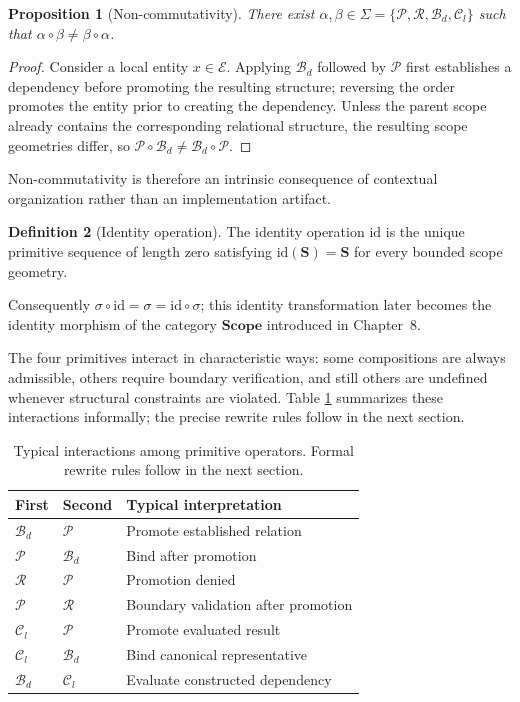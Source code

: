 \documentclass[11pt,twoside,openright]{book}
\numberwithin{equation}{chapter}
\theoremstyle{definition}
\newtheorem{definition}{Definition}[chapter]
\theoremstyle{plain}
\newtheorem{proposition}[definition]{Proposition}
\theoremstyle{remark}
\theoremstyle{definition}
\newcommand{\CatScope}{\mathbf{Scope}}
\newcommand{\Scope}{\mathbf{S}}
\newcommand{\ScopeMorph}{\sigma}
\newcommand{\Alphabet}{\Sigma}
\newcommand{\Pop}{\mathcal{P}}
\newcommand{\Refuse}{\mathcal{R}}
\newcommand{\Bind}{\mathcal{B}_d}
\newcommand{\Collapse}{\mathcal{C}_l}
\newcommand{\ScopeAlphabet}{\Alphabet=\{\Pop,\Refuse,\Bind,\Collapse\}}
\newcommand{\Interior}{\mathcal{E}}
\begin{document}
\begin{proposition}[Non-commutativity]
There exist $\alpha,\beta\in\ScopeAlphabet$ such that
$\alpha\circ\beta\neq\beta\circ\alpha$.
\end{proposition}

\begin{proof}
Consider a local entity $x\in\Interior$. Applying $\Bind$ followed by $\Pop$
first establishes a dependency before promoting the resulting structure;
reversing the order promotes the entity prior to creating the dependency.
Unless the parent scope already contains the corresponding relational
structure, the resulting scope geometries differ, so
$\Pop\circ\Bind\neq\Bind\circ\Pop$.
\end{proof}

Non-commutativity is therefore an intrinsic consequence of contextual
organization rather than an implementation artifact.

\begin{definition}[Identity operation]
The identity operation $\mathrm{id}$ is the unique primitive sequence of
length zero satisfying $\mathrm{id}(\Scope)=\Scope$ for every bounded scope
geometry.
\end{definition}

Consequently $\ScopeMorph\circ\mathrm{id}=\ScopeMorph=\mathrm{id}\circ\ScopeMorph$;
this identity transformation later becomes the identity morphism of the
category $\CatScope$ introduced in Chapter~8.

The four primitives interact in characteristic ways: some compositions
are always admissible, others require boundary verification, and still
others are undefined whenever structural constraints are violated. Table
\ref{tab:primitive-interaction} summarizes these interactions
informally; the precise rewrite rules follow in the next section.

\begin{table}[h]
\centering
\begin{tabular}{lll}
\toprule
First & Second & Typical interpretation \\
\midrule
$\Bind$ & $\Pop$ & Promote established relation \\
$\Pop$ & $\Bind$ & Bind after promotion \\
$\Refuse$ & $\Pop$ & Promotion denied \\
$\Pop$ & $\Refuse$ & Boundary validation after promotion \\
$\Collapse$ & $\Pop$ & Promote evaluated result \\
$\Collapse$ & $\Bind$ & Bind canonical representative \\
$\Bind$ & $\Collapse$ & Evaluate constructed dependency \\
\bottomrule
\end{tabular}
\caption{Typical interactions among primitive operators. Formal rewrite
rules follow in the next section.}
\label{tab:primitive-interaction}
\end{table}
\end{document}
